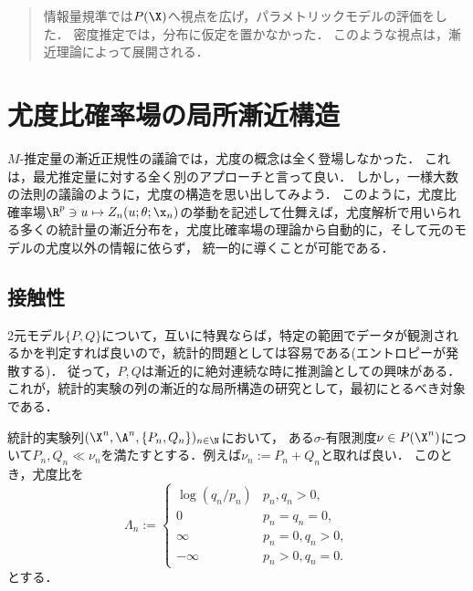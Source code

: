 \documentclass[uplatex,dvipdfmx]{jsreport}
\begin{document}
\begin{quotation}
    情報量規準では$P(\X)$へ視点を広げ，パラメトリックモデルの評価をした．
    密度推定では，分布に仮定を置かなかった．
    このような視点は，漸近理論によって展開される．
\end{quotation}

\section{尤度比確率場の局所漸近構造}

\begin{tcolorbox}[colframe=ForestGreen, colback=ForestGreen!10!white,breakable,colbacktitle=ForestGreen!40!white,coltitle=black,fonttitle=\bfseries\sffamily,
title=]
    $M$-推定量の漸近正規性の議論では，尤度の概念は全く登場しなかった．
    これは，最尤推定量に対する全く別のアプローチと言って良い．
    しかし，一様大数の法則の議論のように，尤度の構造を思い出してみよう．
    このように，尤度比確率場$\R^p\ni u\mapsto Z_n(u;\theta;\x_n)$の挙動を記述して仕舞えば，尤度解析で用いられる多くの統計量の漸近分布を，尤度比確率場の理論から自動的に，そして元のモデルの尤度以外の情報に依らず，
    統一的に導くことが可能である．
\end{tcolorbox}

\subsection{接触性}

\begin{tcolorbox}[colframe=ForestGreen, colback=ForestGreen!10!white,breakable,colbacktitle=ForestGreen!40!white,coltitle=black,fonttitle=\bfseries\sffamily,
title=]
    2元モデル$\{P,Q\}$について，互いに特異ならば，特定の範囲でデータが観測されるかを判定すれば良いので，統計的問題としては容易である(エントロピーが発散する)．
    従って，$P,Q$は漸近的に絶対連続な時に推測論としての興味がある．
    これが，統計的実験の列の漸近的な局所構造の研究として，最初にとるべき対象である．
\end{tcolorbox}

\begin{model}[2元漸近模型]
    統計的実験列$(\X^n,\A^n,\{P_n,Q_n\})_{n\in\N}$において，
    ある$\sigma$-有限測度$\nu\in P(\X^n)$について$P_n,Q_n\ll\nu_n$を満たすとする．例えば$\nu_n:=P_n+Q_n$と取れば良い．
    このとき，尤度比を
    \[\Lambda_n:=\begin{cases}
        \log(q_n/p_n)&p_n,q_n>0,\\
        0&p_n=q_n=0,\\
        \infty&p_n=0,q_n>0,\\
        -\infty&p_n>0,q_n=0.
    \end{cases}\]
    とする．
\end{model}
\end{document}
